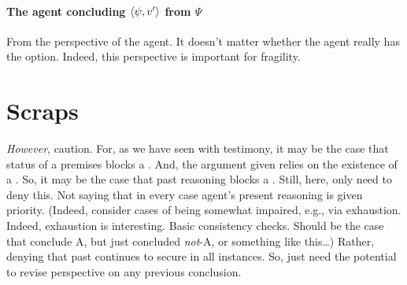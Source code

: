 \paragraph*{The agent concluding \(\langle \psi, v' \rangle\) from \(\Psi\)}

\begin{note}
  From the perspective of the agent.
  It doesn't matter whether the agent really has the option.
  Indeed, this perspective is important for fragility.
\end{note}

\section{Scraps}
\label{sec:scraps}

\begin{note}
  \emph{However}, caution.
  For, as we have seen with testimony, it may be the case that status of a premises blocks a \requ{}.
  And, the argument given relies on the existence of a \requ{}.
  So, it may be the case that past reasoning blocks a \requ{}.
  Still, here, only need to deny this.
  Not saying that in every case agent's present reasoning is given priority.
  (Indeed, consider cases of being somewhat impaired, e.g., via exhaustion.
  Indeed, exhaustion is interesting.
  Basic consistency checks.
  Should be the case that conclude A, but just concluded \emph{not}-A, or something like this\dots)
  Rather, denying that past continues to secure in all instances.
  So, just need the potential to revise perspective on any previous conclusion.
\end{note}

